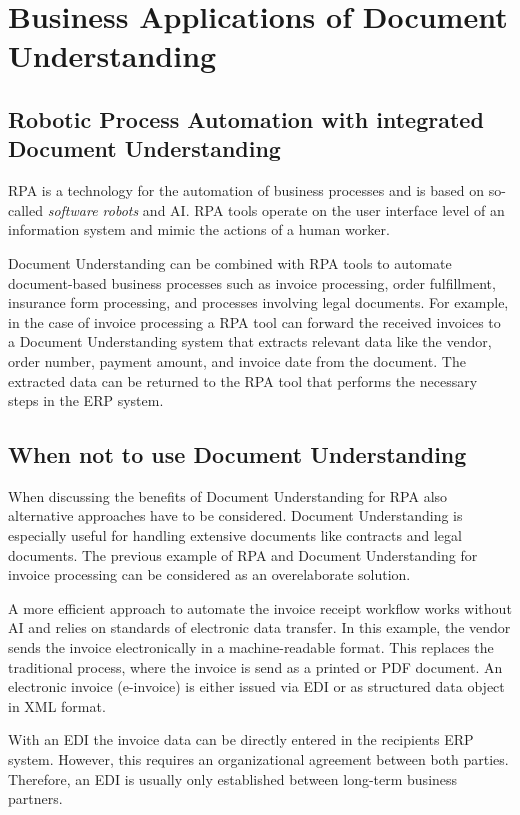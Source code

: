 \section{Business Applications of Document Understanding}
\subsection{Robotic Process Automation with integrated Document Understanding}
\ac{RPA} is a technology for the automation of business processes and is based on so-called \textit{software robots} and \ac{AI}. \ac{RPA} tools operate on the user interface level of an information system and mimic the actions of a human worker. 
\cite{van2018robotic}

Document Understanding can be combined with \ac{RPA} tools to automate document-based business processes such as invoice processing, order fulfillment, insurance form processing, and processes involving legal documents. For example, in the case of invoice processing a \ac{RPA} tool can forward the received invoices to a Document Understanding system that extracts relevant data like the vendor, order number, payment amount, and invoice date from the document. The extracted data can be returned to the \ac{RPA} tool that performs the necessary steps in the \ac{ERP} system.
\cite{leiAI,van2018robotic}

\subsection{When not to use Document Understanding}
When discussing the benefits of Document Understanding for \ac{RPA} also alternative approaches have to be considered. Document Understanding is especially useful for handling extensive documents like contracts and legal documents.
The previous example of \ac{RPA} and Document Understanding for invoice processing can be considered as an overelaborate solution. \cite{leiAI}

A more efficient approach to automate the invoice receipt workflow works without \ac{AI} and relies on standards of electronic data transfer. In this example, the vendor sends the invoice electronically in a machine-readable format. This replaces the traditional process, where the invoice is send as a printed or PDF document. An electronic invoice (e-invoice) is either issued via \ac{EDI} or as structured data object in XML format. \cite{alt2002integrierte,XRechnung}

With an \ac{EDI} the invoice data can be directly entered in the recipients \ac{ERP} system. However, this requires an organizational agreement between both parties. Therefore, an \ac{EDI} is usually only established between long-term business partners. \cite{alt2002integrierte,au2001should}

